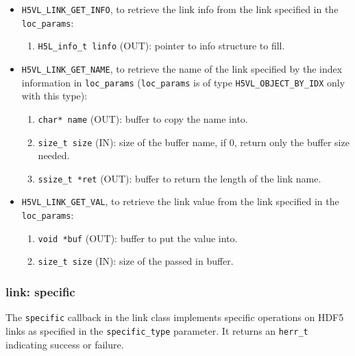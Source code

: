 \begin{itemize}
\item \texttt{H5VL\_LINK\_GET\_INFO}, to retrieve the link info from the
  link specified in the \texttt{loc\_params}:
  \begin{enumerate}
  \item \texttt{H5L\_info\_t linfo} (OUT): pointer to info structure to
    fill.
  \end{enumerate}

\item \texttt{H5VL\_LINK\_GET\_NAME}, to retrieve the name of the link
  specified by the index information in \texttt{loc\_params} (\texttt{loc\_params} is of type \texttt{H5VL\_OBJECT\_BY\_IDX} only with this
  type):
  \begin{enumerate}
  \item \texttt{char* name} (OUT): buffer to copy the name into.
  \item \texttt{size\_t size} (IN): size of the buffer name, if 0, return
    only the buffer size needed.
  \item \texttt{ssize\_t *ret} (OUT): buffer to return the length of the
    link name.
  \end{enumerate}

\item \texttt{H5VL\_LINK\_GET\_VAL}, to retrieve the link value from the
  link specified in the \texttt{loc\_params}:
  \begin{enumerate}
  \item \texttt{void *buf} (OUT): buffer to put the value into.
  \item \texttt{size\_t size} (IN): size of the passed in buffer.
  \end{enumerate}
\end{itemize}

\subsubsection{link: specific}
The \texttt{specific} callback in the link class implements specific operations on HDF5 links as specified in the \texttt{specific\_type} parameter. It returns an \texttt{herr\_t} indicating success or failure.\bigskip

